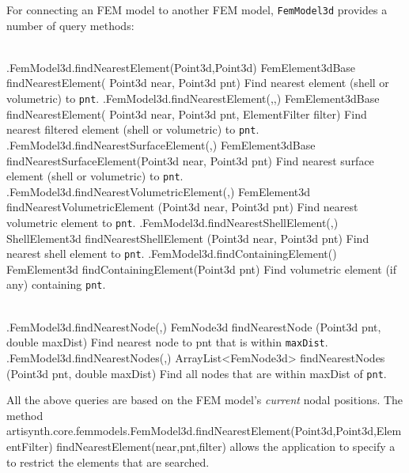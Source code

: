 For connecting an FEM model to another FEM model, {\tt FemModel3d}
provides a number of query methods:
%
%
\begin{methodtable}[4pt]{0.5}{0.5}
\midline
{}\\
\midline
%
\methodentry
{\fem.FemModel3d.findNearestElement(Point3d,Point3d)}%
{FemElement3dBase findNearestElement(\brh
  Point3d near, Point3d pnt)}%
{Find nearest element (shell or volumetric) to {\tt pnt}.}%
%
\methodentry
{\fem.FemModel3d.findNearestElement(,,)}%
{FemElement3dBase findNearestElement(\brh
  Point3d near, Point3d pnt, ElementFilter filter)}%
{Find nearest filtered element (shell or volumetric) to {\tt pnt}.}%
%
\methodentry
{\fem.FemModel3d.findNearestSurfaceElement(,)}%
{FemElement3dBase findNearestSurfaceElement(\brh Point3d near, Point3d pnt)}%
{Find nearest surface element (shell or volumetric) to {\tt pnt}.}%
%
\methodentry
{\fem.FemModel3d.findNearestVolumetricElement(,)}%
{FemElement3d findNearestVolumetricElement (\brh Point3d near, Point3d pnt)}%
{Find nearest volumetric element to {\tt pnt}.}%
%
\methodentry
{\fem.FemModel3d.findNearestShellElement(,)}%
{ShellElement3d findNearestShellElement (\brh Point3d near, Point3d pnt)}%
{Find nearest shell element to {\tt pnt}.}%
%
\methodentry
{\fem.FemModel3d.findContainingElement()}%
{FemElement3d findContainingElement(Point3d pnt)}%
{Find volumetric element (if any) containing {\tt pnt}.}%
%
\midline
\end{methodtable}

\begin{methodtable}[4pt]{0.5}{0.5}
\midline
{}\\
\midline
\methodentry
{\fem.FemModel3d.findNearestNode(,)}%
{FemNode3d findNearestNode (\brh Point3d pnt, double maxDist)}%
{Find nearest node to pnt that is within {\tt maxDist}.}%
%
\methodentry
{\fem.FemModel3d.findNearestNodes(,)}%
{ArrayList<FemNode3d> findNearestNodes (\brh Point3d pnt, double maxDist)}%
{Find all nodes that are within maxDist of {\tt pnt}.}%
%
\midline
\end{methodtable}
%

All the above queries are based on the FEM model's {\it current} nodal
positions.  The method\\
\javamethodAlt%
{artisynth.core.femmodels.FemModel3d.findNearestElement(Point3d,Point3d,ElementFilter)}%
{findNearestElement(near,pnt,filter)} allows the application to
specify
a  to
restrict the elements that are searched.

